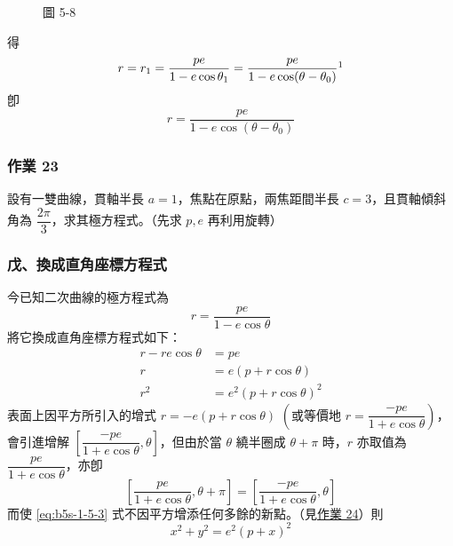 \begin{figure}[H]
\caption*{圖 5-8}
\label{fig:b5s-5-8}
\end{figure}

得
\[
  r = r_1 = \frac{pe}{1 - e\cos\theta_1} = \frac{pe}{1 - e\cos(\theta - \theta_0)}\footnotemark
\]
\label{note:b5s-ch1-p51-eq}
卽
\[
  r = \frac{pe}{1 - e\cos(\theta - \theta_0)}
\]

\subsubsection*{作業 23}
設有一雙曲線，貫軸半長 $a = 1$，焦點在原點，兩焦距間半長 $c = 3$，且貫軸傾斜角為 $\dfrac{2\pi}{3}$，求其極方程式。（先求 $p, e$ 再利用旋轉）

\subsubsection*{戊、換成直角座標方程式}

今已知二次曲線的極方程式為
\begin{equation}
  r = \frac{pe}{1 - e\cos\theta} \tag{2} \label{eq:b5s-1-5-2}
\end{equation}
將它換成直角座標方程式如下：
\begin{align}
  r - re\cos\theta &= pe \nonumber \\
  r &= e(p + r\cos\theta) \nonumber \\
  r^2 &= e^2(p + r\cos\theta)^2 \tag{3} \label{eq:b5s-1-5-3}
\end{align}
表面上因平方所引入的增式 $r = -e(p + r\cos\theta)$ $\left(\text{或等價地 } r = \dfrac{-pe}{1 + e\cos\theta}\right)$，會引進增解 $\left[\dfrac{-pe}{1 + e\cos\theta}, \theta\right]$，但由於當 $\theta$ 繞半圈成 $\theta + \pi$ 時，$r$ 亦取值為 $\dfrac{pe}{1 + e\cos\theta}$，亦卽
\[
  \left[\frac{pe}{1 + e\cos\theta}, \theta + \pi\right] = \left[\frac{-pe}{1 + e\cos\theta}, \theta\right]
\]
而使 \eqref{eq:b5s-1-5-3} 式不因平方增添任何多餘的新點。（見\underline{作業 24}）則
\[
  x^2 + y^2 = e^2(p + x)^2
\]

